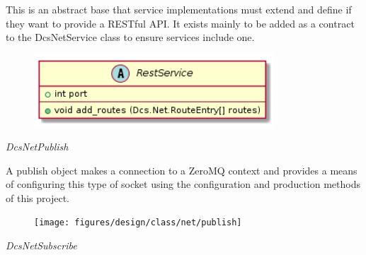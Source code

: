       \vspace*{-0.75cm}
      \begin{minipage}[t]{0.5\textwidth}
        \vspace*{0.5cm}
        This is an abstract base that service implementations must extend and
        define if they want to provide a RESTful API. It exists mainly to be
        added as a contract to the DcsNetService class to ensure services
        include one.
      \end{minipage} \hfill
      \begin{minipage}[t]{0.45\textwidth}
        \begin{figure}[H]
          \includegraphics[width=0.8\textwidth]{figures/design/class/net/rest-service}
          \label{fig:dsg-classes-net-rest-service}
        \end{figure}
      \end{minipage}

      \emph{DcsNetPublish}

      \vspace*{-0.75cm}
      \begin{minipage}[t]{0.5\textwidth}
        \vspace*{0.5cm}
        A publish object makes a connection to a ZeroMQ context and provides a
        means of configuring this type of socket using the configuration and
        production methods of this project.
      \end{minipage} \hfill
      \begin{minipage}[t]{0.45\textwidth}
        \begin{figure}[H]
          \texttt{[image: figures/design/class/net/publish]}
          \label{fig:dsg-classes-net-publish}
        \end{figure}
      \end{minipage}

      \emph{DcsNetSubscribe}

